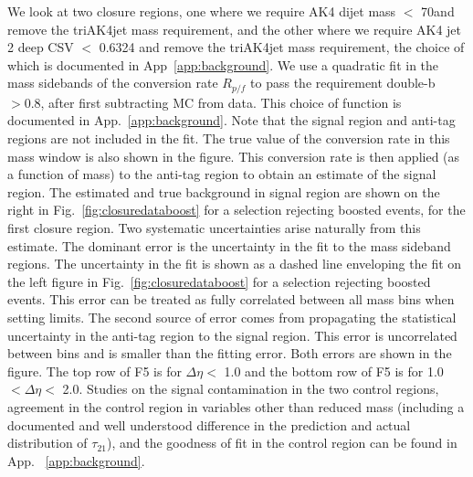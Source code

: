 We look at two closure regions, one where we require AK4 dijet mass $<$ 70\GeV and remove the triAK4jet mass requirement, and the other where we require AK4 jet 2 deep CSV $<$ 0.6324 and remove the triAK4jet mass requirement, the choice of which is documented in App~\ref{app:background}. We use a quadratic fit in the mass sidebands of the conversion rate $R_{p/f}$ to pass the requirement double-b$ > 0.8$, after first subtracting \ttbar MC from data. This choice of function is documented in App.~\ref{app:background}. Note that the signal region and anti-tag regions are not included in the fit. The true value of the conversion rate in this mass window is also shown in the figure. This conversion rate is then applied (as a function of mass) to the anti-tag region to obtain an estimate of the signal region. The estimated and true background in signal region are shown on the right in Fig.~\ref{fig:closuredataboost} for a selection rejecting boosted events, for the first closure region. Two systematic uncertainties arise naturally from this estimate. The dominant error is the uncertainty in the fit to the mass sideband regions. The uncertainty in the fit is shown as a dashed line enveloping the fit on the left figure in Fig.~\ref{fig:closuredataboost} for a selection rejecting boosted events. This error can be treated as fully correlated between all mass bins when setting limits. The second source of error comes from propagating the statistical uncertainty in the anti-tag region to the signal region. This error is uncorrelated between bins and is smaller than the fitting error. Both errors are shown in the figure. The top row of F5 is for $\Delta\eta <$ 1.0 and the bottom row of F5 is for 1.0 $< \Delta\eta <$ 2.0. Studies on the signal contamination in the two control regions, agreement in the control region in variables other than reduced mass (including a documented and well understood difference in the prediction and actual distribution of $\tau_{21}$), and the goodness of fit in the control region can be found in App. ~\ref{app:background}.

